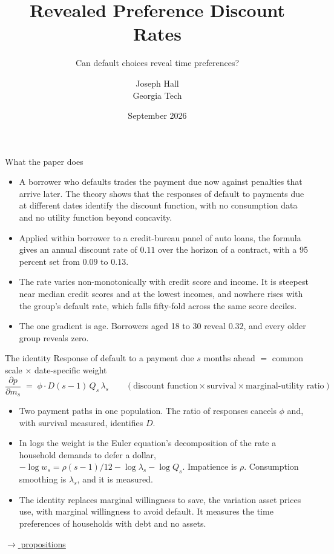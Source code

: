 \documentclass[aspectratio=169,11pt]{beamer}
\title{Revealed Preference Discount Rates}
\subtitle{Can default choices reveal time preferences?}
\author{Joseph Hall\\Georgia Tech}
\date{September 2026}
\newcommand{\m}[1]{\item #1}
\newcommand{\backup}[2]{\hfill{\scriptsize\hyperlink{#1}{\textcolor{bureaublue}{$\rightarrow$ #2}}}}
\begin{document}
\begin{frame}[plain]\titlepage\end{frame}

\begin{frame}{What the paper does}
\begin{itemize}
\m{A borrower who defaults trades the payment due now against penalties that arrive later. The theory shows that the responses of default to payments due at different dates identify the discount function, with no consumption data and no utility function beyond concavity.}
\m{Applied within borrower to a credit-bureau panel of auto loans, the formula gives an annual discount rate of $0.11$ over the horizon of a contract, with a 95 percent set from $0.09$ to $0.13$.}
\m{The rate varies non-monotonically with credit score and income. It is steepest near median credit scores and at the lowest incomes, and nowhere rises with the group's default rate, which falls fifty-fold across the same score deciles.}
\m{The one gradient is age. Borrowers aged 18 to 30 reveal $0.32$, and every older group reveals zero.}
\end{itemize}
\end{frame}

\begin{frame}{The identity}
Response of default to a payment due $s$ months ahead $=$ common scale $\times$ date-specific weight
\[ \frac{\partial p}{\partial m_s} \;=\; \phi \cdot D(s-1)\, Q_s\, \lambda_s \qquad (\text{discount function} \times \text{survival} \times \text{marginal-utility ratio}) \]
\begin{itemize}
\m{Two payment paths in one population. The ratio of responses cancels $\phi$ and, with survival measured, identifies $D$.}
\m{In logs the weight is the Euler equation's decomposition of the rate a household demands to defer a dollar, $-\log w_s = \rho(s-1)/12 - \log\lambda_s - \log Q_s$. Impatience is $\rho$. Consumption smoothing is $\lambda_s$, and it is measured.}
\m{The identity replaces marginal willingness to save, the variation asset prices use, with marginal willingness to avoid default. It measures the time preferences of households with debt and no assets.}
\end{itemize}
\backup{bk-theory}{propositions}
\end{frame}
\end{document}
